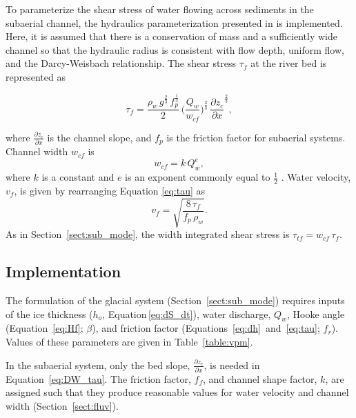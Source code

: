 \documentclass[draft]{agujournal2019}
\begin{document}
To parameterize the shear stress of water flowing across sediments in the subaerial channel,  the hydraulics parameterization presented in  is implemented.
Here, it is assumed that there is a conservation of mass and a sufficiently wide channel so that the hydraulic radius is consistent with flow depth, uniform flow, and the Darcy-Weisbach relationship.
The shear stress $\tau_f$ at the river bed is represented as
\begin{linenomath*}
  \begin{equation}
    \label{eq:DW_tau}
    \tau_f=\frac{\rho_w\,g^{\frac{2}{3}}\,f_p^{\frac{1}{3}}}{2}\, \Big(\frac{Q_w}{w_{cf}} \Big)^{\frac{2}{3}} \,\frac{\partial z_c}{\partial x}^{\frac{2}{3}},
  \end{equation}
\end{linenomath*}
where $\frac{\partial z_c}{\partial x}$ is the channel slope, and $f_p$ is the friction factor for subaerial systems.
Channel width $w_{cf}$ is 
\begin{equation}
  \label{eq:wcf}
  w_{cf} = k \, Q_w^e,
\end{equation}
% 
where $k$ is a constant and $e$ is an exponent commonly equal to $\frac{1}{2}$ \cite{leopold1953}.
Water velocity, $v_f$, is given by rearranging Equation \ref{eq:tau} as
\begin{equation}
  \label{eq:vf}
  v_f = \sqrt{\frac{8\,\tau_f}{f_p\,\rho_w}}.
\end{equation}
% 
As in Section~\ref{sect:sub_mode}, the width integrated shear stress is $\tau_{tf}=w_{cf}\,\tau_f$.

\subsection{Implementation}

The formulation of the glacial system (Section~\ref{sect:sub_mode}) requires inputs of the ice thickness ($h_o$, Equation\,\ref{eq:dS_dt}), water discharge, $Q_w$,  Hooke angle (Equation~\ref{eq:Hf}; $\beta$), and friction factor (Equations~\ref{eq:dh}~and~\ref{eq:tau}; $f_r$). Values of these parameters are given in Table~\ref{table:vpm}.

In the subaerial system,  only the bed slope, $\frac{\partial z_c}{\partial x}$, is needed in Equation~\ref{eq:DW_tau}. The friction factor, $f_f$, and channel shape factor, $k$, are assigned such that they produce reasonable values for water velocity and channel width  (Section~\ref{sect:fluv}).
\end{document}
